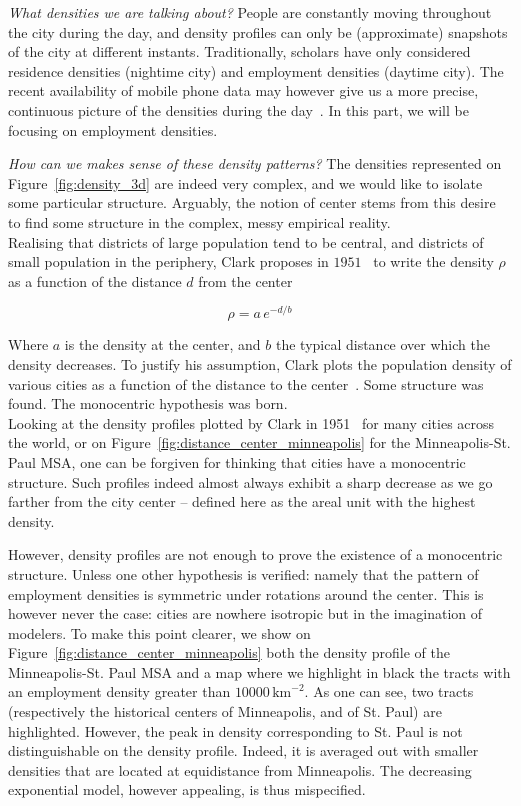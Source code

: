 \emph{What densities we are talking about?} People are constantly moving
throughout the city during the day, and density profiles can only be
(approximate) snapshots of the city at different instants.  Traditionally,
scholars have only considered residence densities (nightime city) and employment
densities (daytime city). The recent availability of mobile phone data may
however give us a more precise, continuous picture of the densities during the
day~\cite{Louail:2014}. In this part, we will be focusing on employment
densities.

\emph{How can we makes sense of these density patterns?} The densities represented
on Figure~\ref{fig:density_3d} are indeed very complex, and we would like to
isolate some particular structure. Arguably, the notion of center stems from
this desire to find some structure in the complex, messy empirical reality. \\

Realising that districts of large population tend to be central, and
districts of small population in the periphery, Clark proposes in
$1951$~\cite{Clark:1951} to write the density $\rho$ as a function of the
distance $d$ from the center

\begin{equation}
    \rho = a\,e^{-d/b} 
\end{equation}

Where $a$ is the density at the center, and $b$ the typical distance over which
the density decreases. To justify his assumption, Clark plots the population
density of various cities as a function of the distance to the
center~\cite{Clark:1951}. Some structure was found. The monocentric hypothesis
was born.\\


Looking at the density profiles plotted by Clark in 1951~\cite{Clark:1951} for
many cities across the world, or on Figure~\ref{fig:distance_center_minneapolis}
for the Minneapolis-St. Paul MSA, one can be
forgiven for thinking that cities have a monocentric structure. Such profiles
indeed almost always exhibit a sharp decrease as we go farther from the city
center -- defined here as the areal unit with the highest density. 

However, density profiles are not enough to prove the existence of a monocentric
structure. Unless one other hypothesis is verified: namely that the pattern of
employment densities is symmetric under rotations around the center. This is
however never the case: cities are nowhere isotropic but in the imagination of
modelers. To make this point clearer, we show on
Figure~\ref{fig:distance_center_minneapolis} both the density profile of the
Minneapolis-St. Paul MSA and a map where we highlight in black the tracts with
an employment density greater than $10000\,\text{km}^{-2}$. As one can see, two
tracts (respectively the historical centers of Minneapolis, and of St. Paul) are
highlighted. However, the peak in density corresponding to St. Paul is not
distinguishable on the density profile.  Indeed, it is averaged out with smaller
densities that are located at equidistance from Minneapolis. The decreasing
exponential model, however appealing, is thus mispecified.\\


